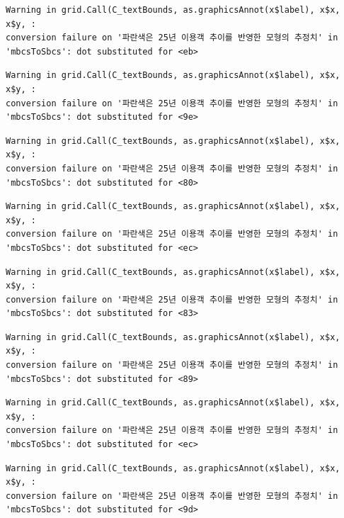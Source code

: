 \documentclass[
  letterpaper,
  DIV=11,
  numbers=noendperiod]{scrreprt}
\begin{document}
\begin{verbatim}
Warning in grid.Call(C_textBounds, as.graphicsAnnot(x$label), x$x, x$y, :
conversion failure on '파란색은 25년 이용객 추이를 반영한 모형의 추정치' in
'mbcsToSbcs': dot substituted for <eb>
\end{verbatim}

\begin{verbatim}
Warning in grid.Call(C_textBounds, as.graphicsAnnot(x$label), x$x, x$y, :
conversion failure on '파란색은 25년 이용객 추이를 반영한 모형의 추정치' in
'mbcsToSbcs': dot substituted for <9e>
\end{verbatim}

\begin{verbatim}
Warning in grid.Call(C_textBounds, as.graphicsAnnot(x$label), x$x, x$y, :
conversion failure on '파란색은 25년 이용객 추이를 반영한 모형의 추정치' in
'mbcsToSbcs': dot substituted for <80>
\end{verbatim}

\begin{verbatim}
Warning in grid.Call(C_textBounds, as.graphicsAnnot(x$label), x$x, x$y, :
conversion failure on '파란색은 25년 이용객 추이를 반영한 모형의 추정치' in
'mbcsToSbcs': dot substituted for <ec>
\end{verbatim}

\begin{verbatim}
Warning in grid.Call(C_textBounds, as.graphicsAnnot(x$label), x$x, x$y, :
conversion failure on '파란색은 25년 이용객 추이를 반영한 모형의 추정치' in
'mbcsToSbcs': dot substituted for <83>
\end{verbatim}

\begin{verbatim}
Warning in grid.Call(C_textBounds, as.graphicsAnnot(x$label), x$x, x$y, :
conversion failure on '파란색은 25년 이용객 추이를 반영한 모형의 추정치' in
'mbcsToSbcs': dot substituted for <89>
\end{verbatim}

\begin{verbatim}
Warning in grid.Call(C_textBounds, as.graphicsAnnot(x$label), x$x, x$y, :
conversion failure on '파란색은 25년 이용객 추이를 반영한 모형의 추정치' in
'mbcsToSbcs': dot substituted for <ec>
\end{verbatim}

\begin{verbatim}
Warning in grid.Call(C_textBounds, as.graphicsAnnot(x$label), x$x, x$y, :
conversion failure on '파란색은 25년 이용객 추이를 반영한 모형의 추정치' in
'mbcsToSbcs': dot substituted for <9d>
\end{verbatim}
\end{document}
